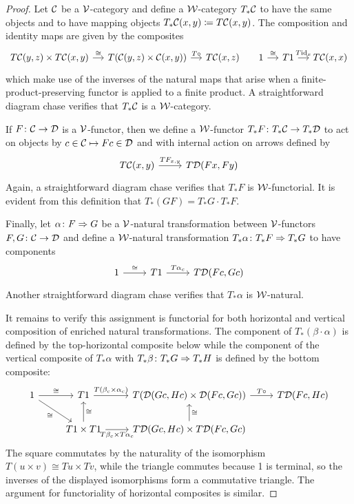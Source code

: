 \begin{proof}  Let ${\mathord{\mathcal{C}}}$ be a ${\mathord{\mathcal{V}}}$-category and define a ${\mathord{\mathcal{W}}}$-category $T_*{\mathord{\mathcal{C}}}$ to have the same objects and to have mapping objects $T_*{\mathord{\mathcal{C}}}(x,y) \coloneq T{\mathord{\mathcal{C}}}(x,y)$. The composition and identity maps are given by the composites
\[
\begin{tikzcd}[column sep=small] T\cC(y,z)\times T\cC(x,y) \arrow[r, "\cong"] & T(\cC(y,z) \times \cC(x,y)) \arrow[r, "T\circ"] & T\cC(x,z) & 1 \arrow[r, "\cong"] & T1 \arrow[r, "T\id_x"] & T\cC(x,x)
\end{tikzcd}
\]
which make use of the inverses of the natural maps that arise when a finite-product-preserving functor is applied to a finite product. A straightforward diagram chase verifies that $T_*{\mathord{\mathcal{C}}}$ is a ${\mathord{\mathcal{W}}}$-category.

If $F \colon {\mathord{\mathcal{C}}} \to {\mathord{\mathcal{D}}}$ is a ${\mathord{\mathcal{V}}}$-functor, then we define a ${\mathord{\mathcal{W}}}$-functor $T_*F \colon T_*{\mathord{\mathcal{C}}} \to T_*{\mathord{\mathcal{D}}}$ to act on objects by $c \in{\mathord{\mathcal{C}}} \mapsto Fc \in {\mathord{\mathcal{D}}}$ and with internal action on arrows defined by
\[ \begin{tikzcd} T\cC(x,y) \arrow[r, "TF_{x,y}"] & T\cD(Fx,Fy) \end{tikzcd}
\]
Again, a straightforward diagram chase verifies that $T_*F$ is ${\mathord{\mathcal{W}}}$-functorial. It is evident from this definition that $T_*(GF) = T_*G \cdot T_*F$.

Finally, let $\alpha \colon F \Rightarrow G$ be a ${\mathord{\mathcal{V}}}$-natural transformation between ${\mathord{\mathcal{V}}}$-functors $F,G \colon {\mathord{\mathcal{C}}}\to {\mathord{\mathcal{D}}}$ and define a ${\mathord{\mathcal{W}}}$-natural transformation $T_*\alpha \colon T_* F \Rightarrow T_*G$ to have components
\[
\begin{tikzcd} 1 \arrow[r, "\cong"] & T1 \arrow[r, "T\alpha_c"] & T\cD(Fc, Gc)\end{tikzcd}
\]
Another straightforward diagram chase verifies that $T_*\alpha$ is ${\mathord{\mathcal{W}}}$-natural.

It remains to verify this assignment is functorial for both horizontal and vertical composition of enriched natural transformations. %
 The component of $T_*(\beta\cdot\alpha)$ is defined by the top-horizontal composite below while the component of the vertical composite of $T_*\alpha$ with $T_*\beta \colon T_*G \Rightarrow T_*H$ is defined by the bottom composite: \[
\begin{tikzcd} 1 \arrow[r, "\cong"] \arrow[dr, "\cong"'] & T1 \arrow[r, "T(\beta_c\times \alpha_c)"] & T(\cD(Gc, Hc) \times \cD(Fc, Gc)) \arrow[r, "T\circ"] & T\cD(Fc,Hc) \\ & T1 \times T1 \arrow[u, "\cong"'] \arrow[r, "T\beta_c \times T\alpha_c"'] & T\cD(Gc,Hc) \times T\cD(Fc,Gc) \arrow[u, "\cong"']  \end{tikzcd}
\]
The square commutates by the naturality of the isomorphism $T(u \times v) \cong Tu \times Tv$, while the triangle commutes because 1 is terminal, so the inverses of the displayed isomorphisms form a commutative triangle. The argument for functoriality of horizontal composites is similar.
\end{proof}



